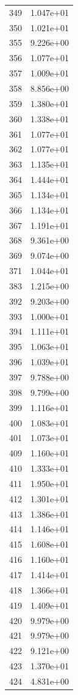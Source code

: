 \documentclass[12pt]{article}
\begin{document}
\begin{longtable}{@{}cc@{}}
349 & 1.047e+01 \\
350 & 1.021e+01 \\
355 & 9.226e+00 \\
356 & 1.077e+01 \\
357 & 1.009e+01 \\
358 & 8.856e+00 \\
359 & 1.380e+01 \\
360 & 1.338e+01 \\
361 & 1.077e+01 \\
362 & 1.077e+01 \\
363 & 1.135e+01 \\
364 & 1.444e+01 \\
365 & 1.134e+01 \\
366 & 1.134e+01 \\
367 & 1.191e+01 \\
368 & 9.361e+00 \\
369 & 9.074e+00 \\
371 & 1.044e+01 \\
383 & 1.215e+00 \\
392 & 9.203e+00 \\
393 & 1.000e+01 \\
394 & 1.111e+01 \\
395 & 1.063e+01 \\
396 & 1.039e+01 \\
397 & 9.788e+00 \\
398 & 9.799e+00 \\
399 & 1.116e+01 \\
400 & 1.083e+01 \\
401 & 1.073e+01 \\
409 & 1.160e+01 \\
410 & 1.333e+01 \\
411 & 1.950e+01 \\
412 & 1.301e+01 \\
413 & 1.386e+01 \\
414 & 1.146e+01 \\
415 & 1.608e+01 \\
416 & 1.160e+01 \\
417 & 1.414e+01 \\
418 & 1.366e+01 \\
419 & 1.409e+01 \\
420 & 9.979e+00 \\
421 & 9.979e+00 \\
422 & 9.121e+00 \\
423 & 1.370e+01 \\
424 & 4.831e+00 \\

\end{longtable}
\end{document}
